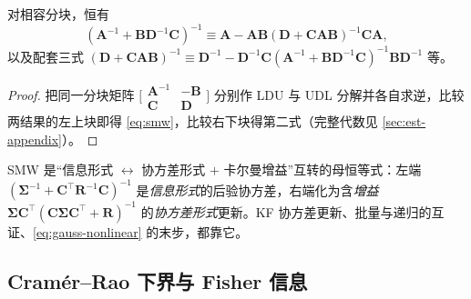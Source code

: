 \begin{lemma}\label{lem:smw}
对相容分块，恒有
\begin{equation}
  (\mathbf{A}^{-1}+\mathbf{B}\mathbf{D}^{-1}\mathbf{C})^{-1}\equiv\mathbf{A}-\mathbf{A}\mathbf{B}(\mathbf{D}+\mathbf{C}\mathbf{A}\mathbf{B})^{-1}\mathbf{C}\mathbf{A},
  \label{eq:smw}
\end{equation}
以及配套三式 $(\mathbf{D}+\mathbf{C}\mathbf{A}\mathbf{B})^{-1}\equiv\mathbf{D}^{-1}-\mathbf{D}^{-1}\mathbf{C}(\mathbf{A}^{-1}+\mathbf{B}\mathbf{D}^{-1}\mathbf{C})^{-1}\mathbf{B}\mathbf{D}^{-1}$ 等。
\end{lemma}
\begin{proof}
把同一分块矩阵 $\big[\begin{smallmatrix}\mathbf{A}^{-1}&-\mathbf{B}\\\mathbf{C}&\mathbf{D}\end{smallmatrix}\big]$ 分别作 LDU 与 UDL 分解并各自求逆，比较两结果的左上块即得 \cref{eq:smw}，比较右下块得第二式（完整代数见 \cref{sec:est-appendix}）。
\end{proof}
\noindent SMW 是“信息形式 $\leftrightarrow$ 协方差形式 $+$ 卡尔曼增益”互转的母恒等式：左端 $(\boldsymbol{\Sigma}^{-1}+\mathbf{C}^\top\mathbf{R}^{-1}\mathbf{C})^{-1}$ 是\emph{信息形式}的后验协方差，右端化为含\emph{增益} $\boldsymbol{\Sigma}\mathbf{C}^\top(\mathbf{C}\boldsymbol{\Sigma}\mathbf{C}^\top+\mathbf{R})^{-1}$ 的\emph{协方差形式}更新。KF 协方差更新、批量与递归的互证、\cref{eq:gauss-nonlinear} 的末步，都靠它。

\subsection{Cramér–Rao 下界与 Fisher 信息}
\label{sec:est-crlb}

